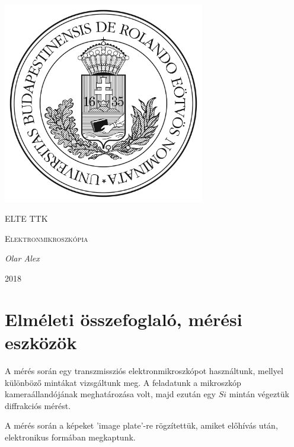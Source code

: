 \documentclass[a4paper,12pt]{article}
\begin{document}
\linespread{1.25}

\begin{titlepage}

	\centering
	\includegraphics[width=0.66\textwidth]{elte.jpg}\par\vspace{1cm}
	{\scshape\LARGE ELTE TTK \par}
	\vspace{3cm}
	{\scshape\Large Elektronmikroszkópia \par}
	\vspace{1cm}
	{\large\itshape Olar Alex\par}
	\vspace{3cm}
	{\large 2018 \par}
	
\end{titlepage}

\tableofcontents

\newpage

\section{Elméleti összefoglaló, mérési eszközök}

\vspace{5mm}

\par A mérés során egy transzmissziós elektronmikroszkópot használtunk, mellyel különböző mintákat vizsgáltunk meg. A feladatunk a mikroszkóp kameraállandójának meghatározása volt, majd ezután egy $Si$ mintán végeztük diffrakciós mérést.

\vspace{5mm}

\par A mérés során a képeket 'image plate'-re rögzítettük, amiket előhívás után, elektronikus formában megkaptunk.
\end{document}
